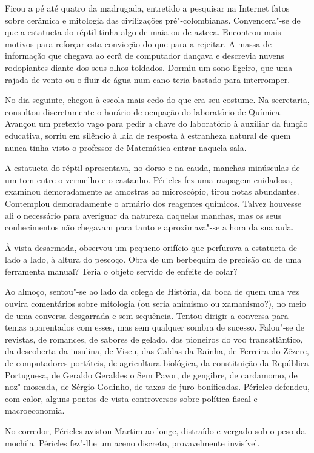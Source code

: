 Ficou a pé até quatro da madrugada, entretido a pesquisar
na Internet fatos sobre cerâmica e mitologia das civilizações
pré"-colombianas. Convencera"-se de que a estatueta do réptil tinha algo
de maia ou de azteca. Encontrou mais motivos para reforçar esta
convicção do que para a rejeitar. A massa de informação que chegava ao
ecrã de computador dançava e descrevia nuvens rodopiantes diante dos
seus olhos toldados. Dormiu um sono ligeiro, que uma rajada de vento ou
o fluir de água num cano teria bastado para interromper.

No dia seguinte, chegou à escola mais cedo do que era seu costume. Na
secretaria, consultou discretamente o horário de ocupação do laboratório
de Química. Avançou um pretexto vago para pedir a chave do laboratório à
auxiliar da função educativa, sorriu em silêncio à laia de resposta à
estranheza natural de quem nunca tinha visto o professor de Matemática
entrar naquela sala.

A estatueta do réptil apresentava, no dorso e na cauda, manchas
minúsculas de um tom entre o vermelho e o castanho. Péricles fez uma
raspagem cuidadosa, examinou demoradamente as amostras ao microscópio,
tirou notas abundantes. Contemplou demoradamente o armário dos
reagentes químicos. Talvez houvesse ali o necessário para averiguar da
natureza daquelas manchas, mas os seus conhecimentos não chegavam para
tanto e aproximava"-se a hora da sua aula.

À vista desarmada, observou um pequeno orifício que perfurava a
estatueta de lado a lado, à altura do pescoço. Obra de um berbequim de
precisão ou de uma ferramenta manual? Teria o objeto servido de enfeite
de colar?

Ao almoço, sentou"-se ao lado da colega de História, da boca de quem uma
vez ouvira comentários sobre mitologia (ou seria animismo ou
xamanismo?), no meio de uma conversa desgarrada e sem sequência.
Tentou dirigir a conversa para temas
aparentados com esses, mas sem qualquer sombra de sucesso. Falou"-se de
revistas, de romances, de sabores de gelado, dos pioneiros do voo
transatlântico, da descoberta da insulina, de Viseu, das Caldas da
Rainha, de Ferreira do Zêzere, de computadores portáteis, de agricultura
biológica, da constituição da República Portuguesa, de Geraldo
Geraldes o Sem Pavor, de gengibre, de cardamomo, de noz"-moscada, de
Sérgio Godinho, de taxas de juro bonificadas. Péricles defendeu, com
calor, alguns pontos de vista controversos sobre política fiscal e
macroeconomia.

No corredor, Péricles avistou Martim ao longe, distraído e vergado sob o
peso da mochila. Péricles fez"-lhe um aceno discreto, provavelmente
invisível.

